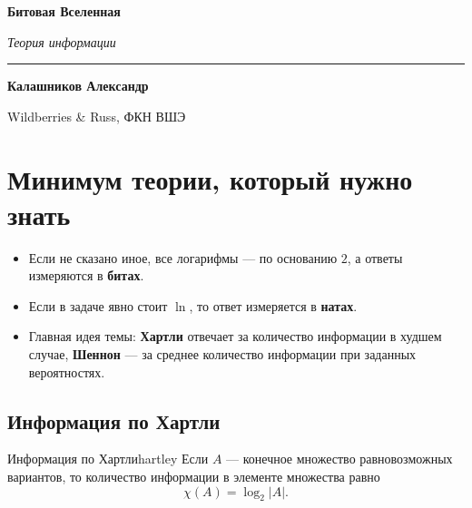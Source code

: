 \documentclass[12pt,a4paper]{article}
\newcommand{\ChiH}{\chi}
\begin{document}
\begin{center}
    \vspace*{1.0cm}
    {\Huge \bfseries Битовая Вселенная\par}
    \vspace{0.4cm}
    {\Large \itshape Теория информации\par}
    \vspace{0.6cm}
    \rule{0.6\textwidth}{1pt}\par
    \vspace{0.6cm}
    {\large \textbf{Калашников Александр}}\par
    \vspace{0.2cm}
    {\small Wildberries \& Russ, ФКН ВШЭ}
    \vspace{1.0cm}
\end{center}

\tableofcontents
\newpage

\section{Минимум теории, который нужно знать}

\begin{tcolorbox}[colback=codebg, colframe=defblue!80!black, title=\textbf{Договорённости}, fonttitle=\bfseries\sffamily, boxrule=1pt]
\begin{itemize}[leftmargin=1.5em]
    \item Если не сказано иное, все логарифмы --- по основанию $2$, а ответы измеряются в \textbf{битах}.
    \item Если в задаче явно стоит $\ln$, то ответ измеряется в \textbf{натах}.
    \item Главная идея темы: \textbf{Хартли} отвечает за количество информации в худшем случае, \textbf{Шеннон} --- за среднее количество информации при заданных вероятностях.
\end{itemize}
\end{tcolorbox}

\subsection{Информация по Хартли}

\begin{definition}{Информация по Хартли}{hartley}
Если $A$ --- конечное множество равновозможных вариантов, то количество информации в элементе множества равно
$$
\ChiH(A)=\log_2 |A|.
$$
\end{definition}
\end{document}
